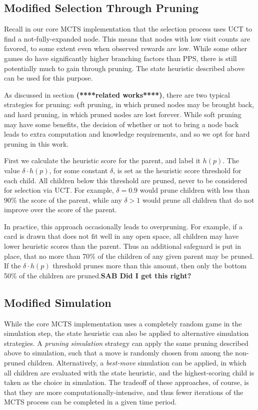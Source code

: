 \documentclass[letterpaper]{article}
\begin{document}
\subsection{Modified Selection Through Pruning}

Recall in our core MCTS implementation that the selection process uses UCT to find a not-fully-expanded node. This means that nodes with low visit counts are favored, to some extent even when observed rewards are low. While some other games do have significantly higher branching factors than PPS, there is still potentially much to gain through pruning. The state heuristic described above can be used for this purpose.

As discussed in section {\bf (****related works****)}, there are two typical strategies for pruning: soft pruning, in which pruned nodes may be brought back, and hard pruning, in which pruned nodes are lost forever. While soft pruning may have some benefits, the decision of whether or not to bring a node back leads to extra computation and knowledge requirements, and so we opt for hard pruning in this work.

First we calculate the heuristic score for the parent, and label it $h(p)$. The value $\delta \cdot h(p)$, for some constant $\delta$, is set as the heuristic score threshold for each child. All children below this threshold are pruned, never to be considered for selection via UCT. For example, $\delta = 0.9$ would prune children with less than 90\% the score of the parent, while any $\delta > 1$ would prune all children that do not improve over the score of the parent.

In practice, this approach occasionally leads to overpruning. For example, if a card is drawn that does not fit well in any open space, all children may have lower heuristic scores than the parent. Thus an additional safeguard is put in place, that no more than 70\% of the children of any given parent may be pruned. If the  $\delta \cdot h(p)$ threshold prunes more than this amount, then only the bottom 50\% of the children are pruned.{\bf SAB Did I get this right?}

\subsection{Modified Simulation}

While the core MCTS implementation uses a completely random game in the simulation step, the state heuristic can also be applied to alternative simulation strategies. A {\it pruning simulation} strategy can apply the same pruning described above to simulation, such that a move is randomly chosen from among the non-pruned children. Alternatively, a {\it best-move} simulation can be applied, in which all children are evaluated with the state heuristic, and the highest-scoring child is taken as the choice in simulation. The tradeoff of these approaches, of course, is that they are more computationally-intensive, and thus fewer iterations of the MCTS process can be completed in a given time period. 
\end{document}
